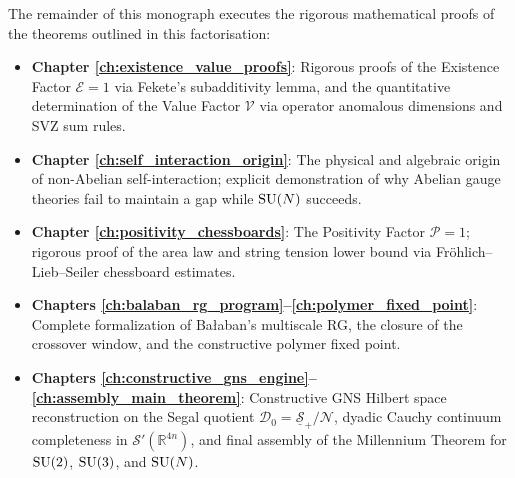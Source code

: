 The remainder of this monograph executes the rigorous mathematical proofs of the theorems outlined in this factorisation:
\begin{itemize}
    \item \textbf{Chapter \ref{ch:existence_value_proofs}}: Rigorous proofs of the Existence Factor $\mathcal{E} = 1$ via Fekete's subadditivity lemma, and the quantitative determination of the Value Factor $\mathcal{V}$ via operator anomalous dimensions and SVZ sum rules.
    \item \textbf{Chapter \ref{ch:self_interaction_origin}}: The physical and algebraic origin of non-Abelian self-interaction; explicit demonstration of why Abelian gauge theories fail to maintain a gap while $\mathrm{SU}(N)$ succeeds.
    \item \textbf{Chapter \ref{ch:positivity_chessboards}}: The Positivity Factor $\mathcal{P} = 1$; rigorous proof of the area law and string tension lower bound via Fr{\"o}hlich--Lieb--Seiler chessboard estimates.
    \item \textbf{Chapters \ref{ch:balaban_rg_program}--\ref{ch:polymer_fixed_point}}: Complete formalization of Ba{\l}aban's multiscale RG, the closure of the crossover window, and the constructive polymer fixed point.
    \item \textbf{Chapters \ref{ch:constructive_gns_engine}--\ref{ch:assembly_main_theorem}}: Constructive GNS Hilbert space reconstruction on the Segal quotient $\mathcal{D}_0 = \underline{\mathcal{S}}_+ / \mathcal{N}$, dyadic Cauchy continuum completeness in $\mathcal{S}'(\mathbb{R}^{4n})$, and final assembly of the Millennium Theorem for $\mathrm{SU}(2)$, $\mathrm{SU}(3)$, and $\mathrm{SU}(N)$.
\end{itemize}